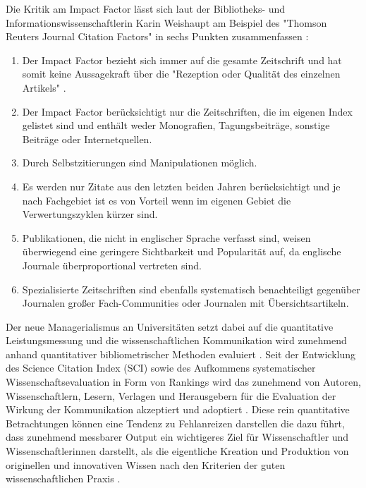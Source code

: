 Die Kritik am Impact Factor lässt sich laut der Bibliotheks- und Informationswissenschaftlerin Karin Weishaupt am Beispiel des "Thomson Reuters Journal Citation Factors" in sechs Punkten zusammenfassen \cite{Weishaupt_2009}:
\begin{enumerate}
\item Der Impact Factor bezieht sich immer auf die gesamte Zeitschrift und hat somit keine Aussagekraft über die "Rezeption oder Qualität des einzelnen Artikels" \cite{Weishaupt_2009}.
\item Der Impact Factor berücksichtigt nur die Zeitschriften, die im eigenen Index gelistet sind und enthält weder Monografien, Tagungsbeiträge, sonstige Beiträge oder Internetquellen.
\item Durch Selbstzitierungen sind Manipulationen möglich.
\item Es werden nur Zitate aus den letzten beiden Jahren berücksichtigt und je nach Fachgebiet ist es von Vorteil wenn im eigenen Gebiet die Verwertungszyklen kürzer sind.
\item Publikationen, die nicht in englischer Sprache verfasst sind, weisen überwiegend eine geringere Sichtbarkeit und Popularität auf, da englische Journale überproportional vertreten sind.
\item Spezialisierte Zeitschriften sind ebenfalls systematisch benachteiligt gegenüber Journalen großer Fach-Communities oder Journalen mit Übersichtsartikeln.
\end{enumerate}

Der neue Managerialismus an Universitäten setzt dabei auf die quantitative Leistungsmessung und die wissenschaftlichen Kommunikation wird zunehmend anhand quantitativer bibliometrischer Methoden evaluiert \cite[:40]{Frost_2014}. Seit der Entwicklung des Science Citation Index (SCI) sowie des Aufkommens systematischer Wissenschaftsevaluation in Form von Rankings wird das zunehmend von Autoren, Wissenschaftlern, Lesern, Verlagen und Herausgebern für die Evaluation der Wirkung der Kommunikation akzeptiert und adoptiert \cite[:2]{Haustein_2012}. Diese rein quantitative Betrachtungen können eine Tendenz zu Fehlanreizen darstellen \cite{Wissenschaftsrat_2015} die dazu führt, dass zunehmend messbarer Output ein wichtigeres Ziel für Wissenschaftler und Wissenschaftlerinnen darstellt, als die eigentliche Kreation und Produktion von originellen und innovativen Wissen nach den Kriterien der guten wissenschaftlichen Praxis \cite[:41]{Frost_2014}.


